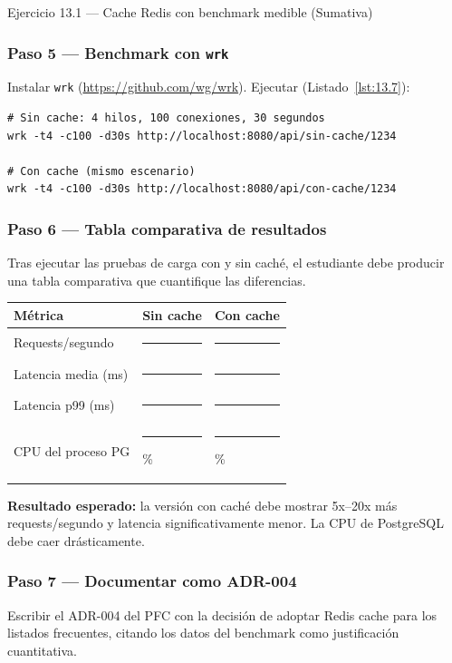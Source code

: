 \documentclass[11pt,a4paper,openany]{book}
\begin{document}
\begin{cajaejercicio}{Ejercicio 13.1 --- Cache Redis con benchmark medible (Sumativa)}
\subsubsection*{Paso 5 --- Benchmark con \texttt{wrk}}

Instalar \texttt{wrk} (\url{https://github.com/wg/wrk}). Ejecutar (Listado~\ref{lst:13.7}):

\begin{lstlisting}[style=shell,numbers=none,caption={Ejemplo de Shell},label=lst:13.7]
# Sin cache: 4 hilos, 100 conexiones, 30 segundos
wrk -t4 -c100 -d30s http://localhost:8080/api/sin-cache/1234

# Con cache (mismo escenario)
wrk -t4 -c100 -d30s http://localhost:8080/api/con-cache/1234
\end{lstlisting}

\subsubsection*{Paso 6 --- Tabla comparativa de resultados}

Tras ejecutar las pruebas de carga con y sin caché, el
estudiante debe producir una tabla comparativa que cuantifique las
diferencias.


\begin{tabularx}{\textwidth}{Xll}
\toprule
\textbf{Métrica} & \textbf{Sin cache} & \textbf{Con cache}\\
\midrule
Requests/segundo  & \rule{1cm}{0.4pt} & \rule{1cm}{0.4pt} \\
Latencia media (ms) & \rule{1cm}{0.4pt} & \rule{1cm}{0.4pt} \\
Latencia p99 (ms)  & \rule{1cm}{0.4pt} & \rule{1cm}{0.4pt} \\
CPU del proceso PG & \rule{1cm}{0.4pt}\% & \rule{1cm}{0.4pt}\% \\
\bottomrule
\end{tabularx}

\textbf{Resultado esperado:} la versión con caché debe mostrar 5x--20x
más requests/segundo y latencia significativamente menor. La CPU de
PostgreSQL debe caer drásticamente.

\subsubsection*{Paso 7 --- Documentar como ADR-004}

Escribir el ADR-004 del PFC con la decisión de adoptar Redis cache
para los listados frecuentes, citando los datos del benchmark como
justificación cuantitativa.
\end{cajaejercicio}
\end{document}
